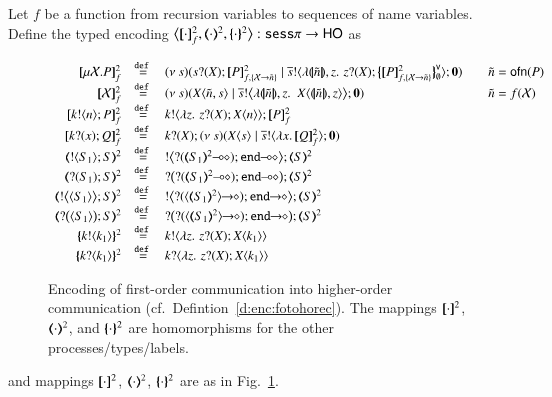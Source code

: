 \begin{definition}\label{d:enc:fotohorec}
	Let $f$ be a function from recursion variables to sequences of name variables.
%
Define the typed encoding $\enco{\map{\cdot}^{2}_f, \mapt{\cdot}^{2}, \mapa{\cdot}^{2}}: \sessp \to \HO$ as
\begin{figure}[t]
\[
	\begin{array}{rcll}
		\pmapp{\recp{X}{P}}{2}{f} &\defeq&
		\newsp{s}{\binp{s}{\X} \pmapp{P}{2}{{f,\{\rvar{X}\to \tilde{n}\}}} \Par \bout{\dual{s}}{\abs{\vmap{\tilde{n}}, z } \,{\binp{z}{\X} \auxmapp{\pmapp{P}{2}{{f,\{\rvar{X}\to \tilde{n}\}}}}{\mathsf{v}}{\es}}} \inact} & \quad \tilde{n} = \ofn{P} \\ 
		\pmapp{\rvar{X}}{2}{f} &\defeq& \newsp{s}{\appl{\X}{\tilde{n}, s} \Par \bbout{\dual{s}}{ \abs{\vmap{\tilde{n}},z}\,\,{\appl{X}{ \vmap{\tilde{n}}, z}}} \inact} & \quad \tilde{n} = f(\rvar{X}) \\
		\pmapp{\bout{k}{n} P}{2}{f}	&\defeq&	\bout{k}{ \abs{z}{\,\binp{z}{X} \appl{X}{n}} } \pmapp{P}{2}{f} \\
		\pmapp{\binp{k}{x} Q}{2}{f}	&\defeq&	\binp{k}{X} \newsp{s}{\appl{X}{s} \Par \bout{\dual{s}}{\abs{x}{\pmapp{Q}{2}{f}}} \inact} \\
		\tmap{\btout{S_1} {S} }{2}	&\defeq&	\bbtout{\lhot{\btinp{\lhot{\tmap{S_1}{2}}}\tinact}} \tmap{S}{2}  \\
		\tmap{\btinp{S_1} S }{2}	&\defeq&	\bbtinp{\lhot{\btinp{\lhot{\tmap{S_1}{2}}}\tinact}} \tmap{S}{2} \\
		\tmap{\bbtout{\chtype{S_1}} {S} }{2}	&\defeq&	\bbtout{\shot{\btinp{\shot{\chtype{\tmap{S_1}{2}}}}\tinact}} \tmap{S}{2}  \\
		\tmap{\bbtinp{\chtype{S_1}} {S} }{2}	&\defeq&	\bbtinp{\shot{\btinp{\shot{\chtype{\tmap{S_1}{2}}}}\tinact}} \tmap{S}{2} \\
		\mapa{\bactout{k}{k_1}}^{2} &\defeq&   \bactout{k}{\abs{z}{\,\binp{z}{X} \appl{X}{k_1}} } \\
		\mapa{\bactinp{k}{k_1}}^{2} &\defeq&   \bactinp{k}{\abs{z}{\,\binp{z}{X} \appl{X}{k_1}} }
	\end{array}
\]
\caption{\label{f:enc:fotohorec}
Encoding of first-order communication into higher-order communication (cf.~Defintion~\ref{d:enc:fotohorec}).
The mappings 
$[\!\![\cdot]\!\!]^2$,
$(\!\!\langle\cdot\rangle\!\!)^2$, 
and 
$\{\!\!\{\cdot\}\!\!\}^2$
are homomorphisms for the other processes/types/labels. 
}

\end{figure}
and mappings $[\!\![\cdot]\!\!]^{2}$, $(\!\!\langle\cdot\rangle\!\!)^{2}$, $\{\!\!\{\cdot\}\!\!\}^{2}$
are as in Fig.~\ref{f:enc:fotohorec}.
\end{definition}

